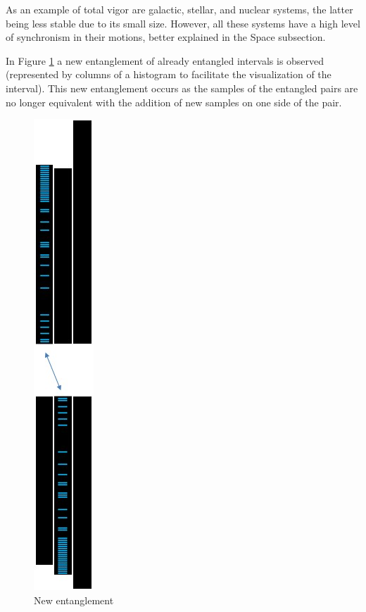 As an example of total vigor are galactic, stellar, and nuclear systems, the latter being less stable due to its small size. However, all these systems have a high level of synchronism in their motions, better explained in the Space subsection.

In Figure \ref{fig:consciousness_space_subconscious_observation_jump} a new entanglement of already entangled intervals is observed (represented by columns of a histogram to facilitate the visualization of the interval). This new entanglement occurs as the samples of the entangled pairs are no longer equivalent with the addition of new samples on one side of the pair.
	\begin{figure}[H]
	\caption{New entanglement}
	\label{fig:consciousness_space_subconscious_observation_jump}
	\centering
	\includegraphics[scale=.53]{sections/images/consciousness_space_subconscious_observation_jump.jpg}
	\end{figure}

